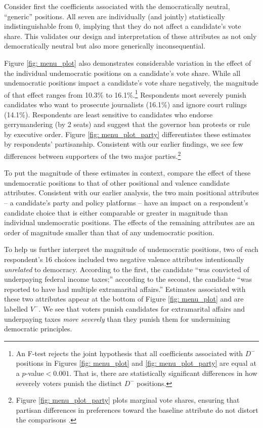 \documentclass[letterpaper, 12pt]{article}
\begin{document}
\begin{raggedright}
Consider first the coefficients associated with the democratically neutral, ``generic'' positions. All seven are individually (and jointly) statistically indistinguishable from 0, implying that they do not affect a candidate's vote share. This validates our design and interpretation of these attributes as not only democratically neutral but also more generically inconsequential.

Figure \ref{fig: menu_plot} also demonstrates considerable variation in the effect of the individual undemocratic positions on a candidate's vote share. While all undemocratic positions impact a candidate's vote share negatively, the magnitude of that effect ranges from 10.3\% to 16.1\%.\footnote{An F-test rejects the joint hypothesis that all coefficients associated with $D^-$ positions in Figures \ref{fig: menu_plot} and \ref{fig: menu_plot_party} are equal at a $p$-value$<0.001$. That is, there are statistically significant differences in how severely voters punish the distinct $D^-$ positions.} Respondents most severely punish candidates who want to prosecute journalists (16.1\%) and ignore court rulings (14.1\%). Respondents are least sensitive to candidates who endorse gerrymandering (by 2 seats) and suggest that the governor ban protests or rule by executive order. Figure \ref{fig: menu_plot_party} differentiates these estimates by respondents' partisanship. Consistent with our earlier findings, we see few differences between supporters of the two major parties.\footnote{Figure \ref{fig: menu_plot_party} plots marginal vote shares, ensuring that partisan differences in preferences toward the baseline attribute do not distort the comparisons \citep{Leeper2018}.}


To put the magnitude of these estimates in context, compare the effect of these undemocratic positions to that of other positional and valence candidate attributes. Consistent with our earlier analysis, the two main positional attributes -- a candidate's party and policy platforms -- have an impact on a respondent's candidate choice that is either comparable or greater in magnitude than individual undemocratic positions. The effects of the remaining attributes are an order of magnitude smaller than that of any undemocratic position.

To help us further interpret the magnitude of undemocratic positions, two of each respondent's 16 choices included two negative valence attributes intentionally \emph{unrelated} to democracy. According to the first, the candidate ``was convicted of underpaying federal income taxes;'' according to the second, the candidate ``was reported to have had multiple extramarital affairs.'' Estimates associated with these two attributes appear at the bottom of Figure \ref{fig: menu_plot} and are labelled $V^-$. We see that voters punish candidates for extramarital affairs and underpaying taxes \emph{more severely} than they punish them for undermining democratic principles.


\end{raggedright}
\end{document}
